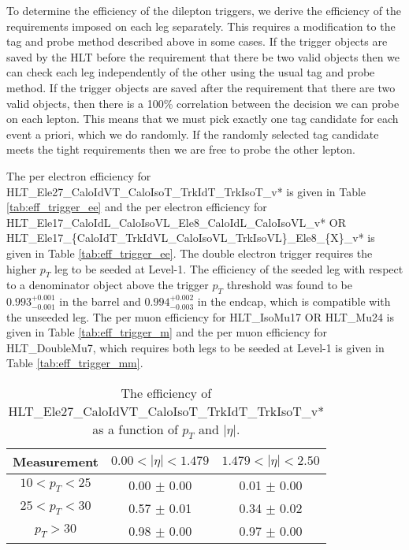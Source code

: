  
To determine the efficiency of the dilepton triggers, 
we derive the efficiency of the requirements imposed on each leg separately.
This requires a modification to the tag and probe method described above in some cases.
If the trigger objects are saved by the HLT before the requirement that there be two valid objects then
we can check each leg independently of the other using the usual tag and probe method.
If the trigger objects are saved after the requirement that there are two valid objects, then there is 
a 100\% correlation between the decision we can probe on each lepton.
This means that we must pick exactly one tag candidate for each event a priori, which we do 
randomly. 
If the randomly selected tag candidate meets the tight requirements then we are free to 
probe the other lepton.

The per electron efficiency for
HLT\_Ele27\_CaloIdVT\_CaloIsoT\_TrkIdT\_TrkIsoT\_v*
is given in Table \ref{tab:eff_trigger_ee}
and the per electron efficiency for 
HLT\_Ele17\_CaloIdL\_CaloIsoVL\_Ele8\_CaloIdL\_CaloIsoVL\_v* OR
HLT\_Ele17\_\{CaloIdT\_TrkIdVL\_CaloIsoVL\_TrkIsoVL\}\_Ele8\_\{X\}\_v*
is given in Table \ref{tab:eff_trigger_ee}.
The double electron trigger requires the higher $p_T$ leg to be seeded at Level-1.
The efficiency of the seeded leg with respect to a denominator object above the
trigger $p_T$ threshold was found to be $0.993^{+0.001}_{-0.001}$ in the barrel and
$0.994^{+0.002}_{-0.003}$ in the endcap, which is compatible with the unseeded leg.
The per muon efficiency for
HLT\_IsoMu17 OR HLT\_Mu24
is given in Table \ref{tab:eff_trigger_m}
and the per muon efficiency for HLT\_DoubleMu7, which requires both legs to be seeded
at Level-1 is
given in Table \ref{tab:eff_trigger_mm}.
\vspace{10pt}
\begin{table}[!ht]
\begin{center}
\begin{tabular}{c|c|c}
\hline
Measurement  & $0.00<|\eta|<1.479$  & $1.479<|\eta|<2.50$  \\ 
\hline
$  10<p_T<  25$ & 0.00 $\pm$ 0.00  & 0.01 $\pm$ 0.00  \\ \hline 
$  25<p_T<  30$ & 0.57 $\pm$ 0.01  & 0.34 $\pm$ 0.02  \\ \hline 
$  p_T>  30$ & 0.98 $\pm$ 0.00  & 0.97 $\pm$ 0.00  \\ \hline 
\end{tabular}
\caption{The efficiency of HLT\_Ele27\_CaloIdVT\_CaloIsoT\_TrkIdT\_TrkIsoT\_v* as a function of $p_T$ and $|\eta|$.}
\label{tab:eff_trigger_e}
\end{center}
\end{table}
